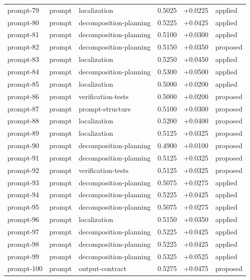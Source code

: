 \begin{center}
\begin{longtable}{llp{5.2cm}rrl}
prompt-79 & prompt & localization & 0.5025 & +0.0225 & applied \\
prompt-80 & prompt & decomposition-planning & 0.5225 & +0.0425 & applied \\
prompt-81 & prompt & decomposition-planning & 0.5100 & +0.0300 & applied \\
prompt-82 & prompt & decomposition-planning & 0.5150 & +0.0350 & proposed \\
prompt-83 & prompt & localization & 0.5250 & +0.0450 & applied \\
prompt-84 & prompt & decomposition-planning & 0.5300 & +0.0500 & applied \\
prompt-85 & prompt & localization & 0.5000 & +0.0200 & applied \\
prompt-86 & prompt & verification-tests & 0.5000 & +0.0200 & proposed \\
prompt-87 & prompt & prompt-structure & 0.5100 & +0.0300 & proposed \\
prompt-88 & prompt & localization & 0.5200 & +0.0400 & proposed \\
prompt-89 & prompt & localization & 0.5125 & +0.0325 & proposed \\
prompt-90 & prompt & decomposition-planning & 0.4900 & +0.0100 & proposed \\
prompt-91 & prompt & decomposition-planning & 0.5125 & +0.0325 & proposed \\
prompt-92 & prompt & verification-tests & 0.5125 & +0.0325 & proposed \\
prompt-93 & prompt & decomposition-planning & 0.5075 & +0.0275 & applied \\
prompt-94 & prompt & decomposition-planning & 0.5225 & +0.0425 & applied \\
prompt-95 & prompt & decomposition-planning & 0.5075 & +0.0275 & applied \\
prompt-96 & prompt & localization & 0.5150 & +0.0350 & applied \\
prompt-97 & prompt & decomposition-planning & 0.5225 & +0.0425 & applied \\
prompt-98 & prompt & decomposition-planning & 0.5225 & +0.0425 & applied \\
prompt-99 & prompt & decomposition-planning & 0.5325 & +0.0525 & applied \\
prompt-100 & prompt & output-contract & 0.5275 & +0.0475 & proposed \\
\bottomrule\end{longtable}\end{center}
\clearpage
